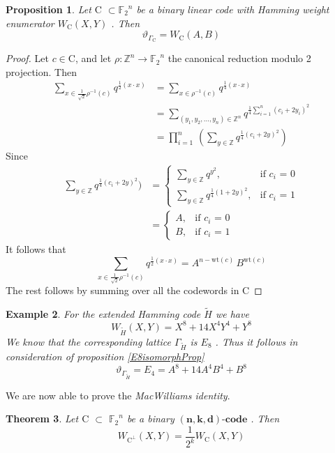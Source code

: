 \documentclass{article}
\newtheorem{theorem}{Theorem}[section]
\newtheorem{example}[theorem]{Example}
\newtheorem{prop}[theorem]{Proposition}
\numberwithin{equation}{theorem}
\numberwithin{figure}{theorem}
\newcommand{\Ftwo}{\ensuremath{\mathbb{F}_2}}
\newcommand{\simpleCodes}{\ensuremath{\mathrm{C}}}
\newcommand{\buildVertical}[1]{\ensuremath{#1^{\bot}}}
\newcommand{\buildLattice}[1]{\ensuremath{\Gamma_{#1}}}
\newcommand{\weightEnumerator}[3]{\ensuremath{W_{#1}(#2,#3)}}
\newcommand{\thetaFunction}[1]{\ensuremath{\vartheta_{#1}}}
\newcommand{\linearCode}[3]{\ensuremath{\bm{(#1,#2,#3)\mbox{-}code}}}
\newcommand{\wt}[1]{\ensuremath{\text{wt}(#1)}}
\newcommand{\Integer}{\ensuremath{\mathbb{Z}}}
\begin{document}
\begin{prop}\label{ABHammingProp}
Let {\simpleCodes} $\subset \Ftwo^n$ be a binary linear code with Hamming weight enumerator {\weightEnumerator{\simpleCodes}{X}{Y}} . Then
\[
	\thetaFunction{\buildLattice{\simpleCodes}} = \weightEnumerator{\simpleCodes}{A}{B}
\]
\end{prop}
\begin{proof}
Let $c \in \simpleCodes$, and let $\rho : \Integer^n \rightarrow \Ftwo^n$ the canonical reduction modulo 2 projection. Then
\begin{align*}
	\sum_{x \in \frac{1}{\sqrt{2}}\rho^{-1}(c)} q^{\frac{1}{2}(x\cdot x)} &= \sum_{x \in \rho^{-1}(c)} q^{\frac{1}{4}(x\cdot x)}\\
	&= \sum_{(y_1,y_2,\ldots,y_n) \in \Integer^n}q^{\frac{1}{4}\sum_{i = 1}^{n}(c_i + 2y_i)^2}\\
	&= \prod_{i = 1}^{n}\,(\sum_{y\in \Integer}q^{\frac{1}{4}(c_i + 2y)^2})
\end{align*}
Since
\begin{align*}
\sum_{y\in \Integer}q^{\frac{1}{4}(c_i + 2y)^2}) &= 
	\begin{cases}
	\sum_{y\in \Integer}q^{y^2}, &\text{if $c_i$ = 0}\\
	\sum_{y\in \Integer}q^{\frac{1}{4}(1 + 2y)^2}, &\text{if $c_i$ = 1} 
	\end{cases}\\
	&= 
	\begin{cases}
	A, &\text{if $c_i$ = 0} \\
	B, &\text{if $c_i$ = 1}
	\end{cases}
\end{align*}
It follows that
\[
\sum_{x \in \frac{1}{\sqrt{2}}\rho^{-1}(c)} q^{\frac{1}{2}(x\cdot x)} = A^{n - \wt{c}}\,B^{\wt{c}}
\] 
The rest follows by summing over all the codewords in $\simpleCodes$
\end{proof}
\begin{example}\label{e8Example}
For the extended Hamming code $\widetilde{H}$ we have
\[
\weightEnumerator{\widetilde{H}}{X}{Y} = X^8 + 14X^4Y^4 + Y^8
\]
We know that the corresponding lattice $\buildLattice{\widetilde{H}}$ is $E_8$ .
Thus it follows in consideration of proposition \ref{E8isomorphProp}
\[
	\thetaFunction{\buildLattice{\widetilde{H}}} = E_4 = A^8 + 14A^4B^4 + B^8
\]
\end{example}
We are now able to prove the \emph{MacWilliams identity}.
\begin{theorem}\label{MacWilliamsTheorem}
Let {\simpleCodes} $\subset$ $\Ftwo^n$ be a binary \linearCode{n}{k}{d} . Then
\[
	\weightEnumerator{\buildVertical{\simpleCodes}}{X}{Y} = \frac{1}{2^k} \weightEnumerator{\simpleCodes}{X}{Y}
\]
\end{theorem}
\end{document}
